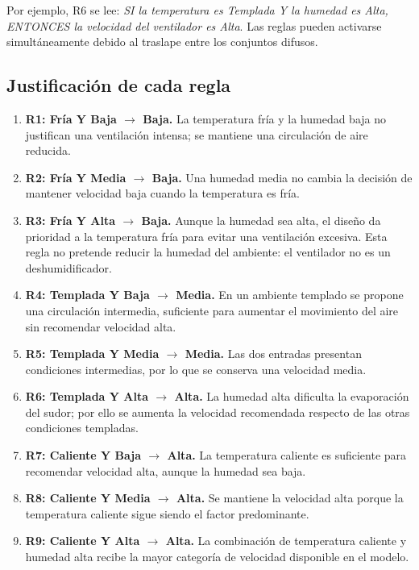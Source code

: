 \documentclass[11pt]{article}
\begin{document}
Por ejemplo, R6 se lee: \emph{SI la temperatura es Templada Y la humedad es
Alta, ENTONCES la velocidad del ventilador es Alta}. Las reglas pueden
activarse simultáneamente debido al traslape entre los conjuntos difusos.

\subsection{Justificación de cada regla}

\begin{enumerate}
\item \textbf{R1: Fría Y Baja $\rightarrow$ Baja.}
La temperatura fría y la humedad baja no justifican una ventilación intensa;
se mantiene una circulación de aire reducida.

\item \textbf{R2: Fría Y Media $\rightarrow$ Baja.}
Una humedad media no cambia la decisión de mantener velocidad baja cuando
la temperatura es fría.

\item \textbf{R3: Fría Y Alta $\rightarrow$ Baja.}
Aunque la humedad sea alta, el diseño da prioridad a la temperatura fría
para evitar una ventilación excesiva. Esta regla no pretende reducir la
humedad del ambiente: el ventilador no es un deshumidificador.

\item \textbf{R4: Templada Y Baja $\rightarrow$ Media.}
En un ambiente templado se propone una circulación intermedia, suficiente
para aumentar el movimiento del aire sin recomendar velocidad alta.

\item \textbf{R5: Templada Y Media $\rightarrow$ Media.}
Las dos entradas presentan condiciones intermedias, por lo que se conserva
una velocidad media.

\item \textbf{R6: Templada Y Alta $\rightarrow$ Alta.}
La humedad alta dificulta la evaporación del sudor; por ello se aumenta la
velocidad recomendada respecto de las otras condiciones templadas.

\item \textbf{R7: Caliente Y Baja $\rightarrow$ Alta.}
La temperatura caliente es suficiente para recomendar velocidad alta,
aunque la humedad sea baja.

\item \textbf{R8: Caliente Y Media $\rightarrow$ Alta.}
Se mantiene la velocidad alta porque la temperatura caliente sigue siendo
el factor predominante.

\item \textbf{R9: Caliente Y Alta $\rightarrow$ Alta.}
La combinación de temperatura caliente y humedad alta recibe la mayor
categoría de velocidad disponible en el modelo.
\end{enumerate}
\end{document}
